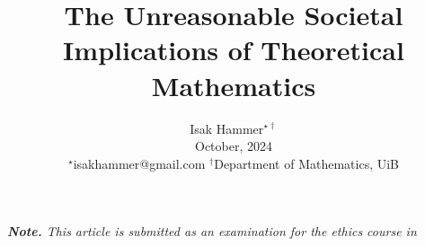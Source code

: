 \documentclass[10pt,conference]{IEEEtran}
\title{ {\Large \textbf{The Unreasonable Societal Implications of Theoretical Mathematics   }} }
\begin{document}
\author{
Isak Hammer$^{\star\dagger}$  \\
{\small  October, 2024}\\
{\footnotesize $^\star$isakhammer@gmail.com }
{\footnotesize $^\dagger$Department of Mathematics, UiB}\\
}

\maketitle
\begin{sloppy}
 \textit{ \textbf{Note.} This article is submitted as an examination for the ethics course in   \\}

\begin{abstract}



\end{abstract}


\end{sloppy}
\end{document}
